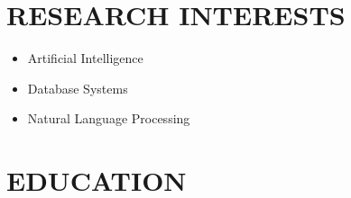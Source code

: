 \documentclass[10pt,a4paper,sans]{moderncv} %
\begin{document}
	
\makecvtitle



\section{RESEARCH INTERESTS}
\begin{itemize}
	\item Artificial Intelligence
	\item Database Systems
	\item Natural Language Processing

\end{itemize}

\section{EDUCATION}
\end{document}
